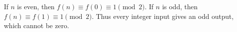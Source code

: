 If $n$ is even, then $f(n)\equiv f(0)\equiv1\pmod2$. If $n$ is odd, then $f(n)\equiv f(1)\equiv1\pmod2$. Thus every integer input gives an odd output, which cannot be zero.

